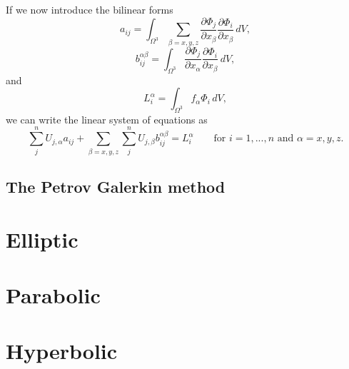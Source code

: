 \documentclass[oneside,a4paper,11pt]{report}
\begin{document}
If we now introduce the bilinear forms 
\begin{equation}
    a_{ij} = \int_{\Omega^3} \sum_{\beta=x,y,z} \frac{\partial \Phi_j}{\partial x_\beta} \frac{\partial \Phi_i}{\partial x_\beta} \,dV,
\end{equation}
\begin{equation}
    b_{ij}^{\alpha \beta} = \int_{\Omega^3}\frac{\partial \Phi_j}{\partial x_\alpha} \frac{\partial \Phi_i}{\partial x_\beta} \, dV,
\end{equation}
and
\begin{equation}
    L_i^\alpha = \int_{\Omega^3} f_\alpha \Phi_i \,dV,
\end{equation}
we can write the linear system of equations as
\begin{equation}
    \sum_j^n U_{j,\alpha} a_{ij} + \sum_{\beta=x,y,z} \sum_j^n U_{j,\beta} b_{ij}^{\alpha \beta} = L_i^\alpha \qquad \text{for } i = 1,...,n \text{ and } \alpha = x,y,z.
\end{equation}

\section{The Petrov Galerkin method}

\chapter{Elliptic}

\chapter{Parabolic}

\chapter{Hyperbolic}

\appendix
\end{document}
